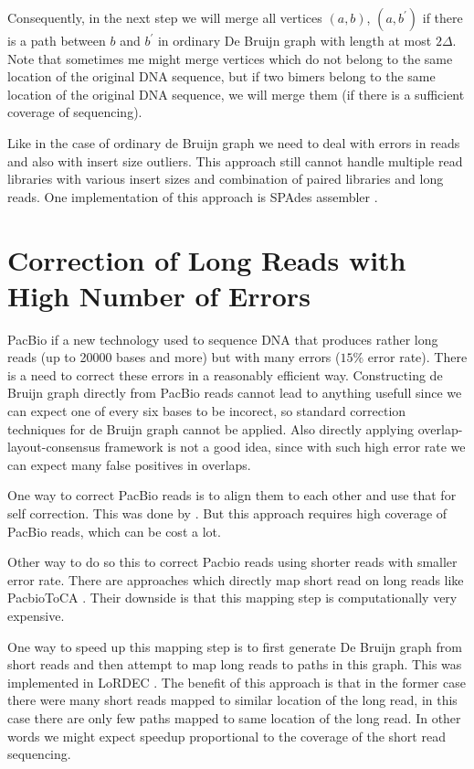 Consequently, in the next step we will merge all vertices $(a, b)$, $(a, b^{'})$ if there is a path
between $b$ and $b^{'}$ in ordinary De Bruijn graph with length at most $2\Delta$.
Note that sometimes me might merge vertices which do not belong to the same location of the original DNA
sequence, but if two bimers belong to the same location of the original DNA sequence, we will merge
them (if there is a sufficient coverage of sequencing).

\bigskip
Like in the case of ordinary de Bruijn graph we need to deal with errors in reads
and also with insert size outliers. This approach still cannot handle multiple
read libraries with various insert sizes and combination of paired libraries and long reads.
One implementation of this approach is SPAdes assembler \citep{Spades}.


\section{Correction of Long Reads with High Number of Errors}

PacBio if a new technology used to sequence DNA that produces
rather long reads (up to 20000 bases and more) but with many errors
($15\%$ error rate). There is a need to correct these errors in a reasonably
efficient way. Constructing de Bruijn graph directly from PacBio reads
cannot lead to anything usefull since we can expect one of every six bases to be
incorect, so standard correction techniques for de Bruijn graph cannot be applied.
Also directly applying overlap-layout-consensus framework is not a good idea, since
with such high error rate we can expect many false positives in overlaps.

One way to correct PacBio reads is to align them to each other and use that for self correction.
This was done by \citet{MHAP}. But this approach requires high coverage
of PacBio reads, which can be cost a lot.

Other way to do so this to correct Pacbio reads using shorter reads with smaller
error rate. There are approaches which directly map short read on long reads like
PacbioToCA \citep{PacbioToCA}. Their downside is that this mapping step
is computationally very expensive.

One way to speed up this mapping step is to first generate De Bruijn graph from short reads
and then attempt to map long reads to paths in this graph.
This was implemented in LoRDEC \citep{Lordec}.
The benefit of this approach is that in the former
case there were many short reads mapped to similar location of the long read, in this
case there are only few paths mapped to same location of the long read. In other
words we might expect speedup proportional to the coverage of the short read sequencing.

